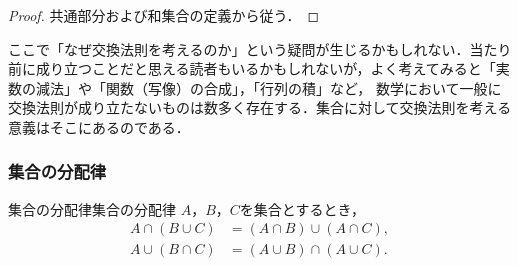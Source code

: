 \begin{tleftbar}
  \begin{proof}
    共通部分および和集合の定義から従う．
  \end{proof}
\end{tleftbar}

\begin{mycolumn}
  ここで「なぜ交換法則を考えるのか」という疑問が生じるかもしれない．当たり前に成り立つことだと思える読者もいるかもしれないが，よく考えてみると「実数の減法」や「関数（写像）の合成」，「行列の積」など，
  数学において一般に交換法則が成り立たないものは数多く存在する．集合に対して交換法則を考える意義はそこにあるのである．
\end{mycolumn}

\subsubsection{集合の分配律}

\begin{prop}{集合の分配律}{集合の分配律}
  $A$，$B$，$C$を集合とするとき，
  \begin{align*}
    A \cap ( B \cup C) & = (A \cap B) \cup (A \cap C), \\
    A \cup ( B \cap C) & = (A \cup B) \cap (A \cup C).
  \end{align*}
\end{prop}

